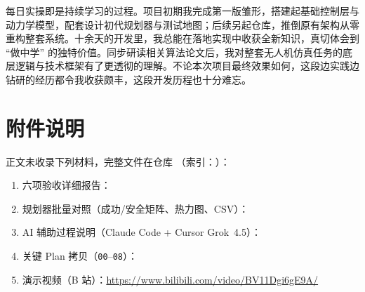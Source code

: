 每日实操即是持续学习的过程。项目初期我完成第一版雏形，搭建起基础控制层与动力学模型，配套设计初代规划器与测试地图；后续另起仓库，推倒原有架构从零重构整套系统。十余天的开发里，我总能在落地实现中收获全新知识，真切体会到 “做中学” 的独特价值。同步研读相关算法论文后，我对整套无人机仿真任务的底层逻辑与技术框架有了更透彻的理解。不论本次项目最终效果如何，这段边实践边钻研的经历都令我收获颇丰，这段开发历程也十分难忘。

\chapter{附件说明}

正文未收录下列材料，完整文件在仓库 （索引：）：

\begin{enumerate}[leftmargin=1.6em,itemsep=0.35em,parsep=0.1em]
  \item 六项验收详细报告：
  \item 规划器批量对照（成功/安全矩阵、热力图、CSV）：
  \item AI 辅助过程说明（Claude Code + Cursor Grok~4.5）：
  \item 关键 Plan 拷贝（\texttt{00}--\texttt{08}）：
  \item 演示视频（B 站）：\url{https://www.bilibili.com/video/BV11Dgi6gE9A/}
\end{enumerate}
